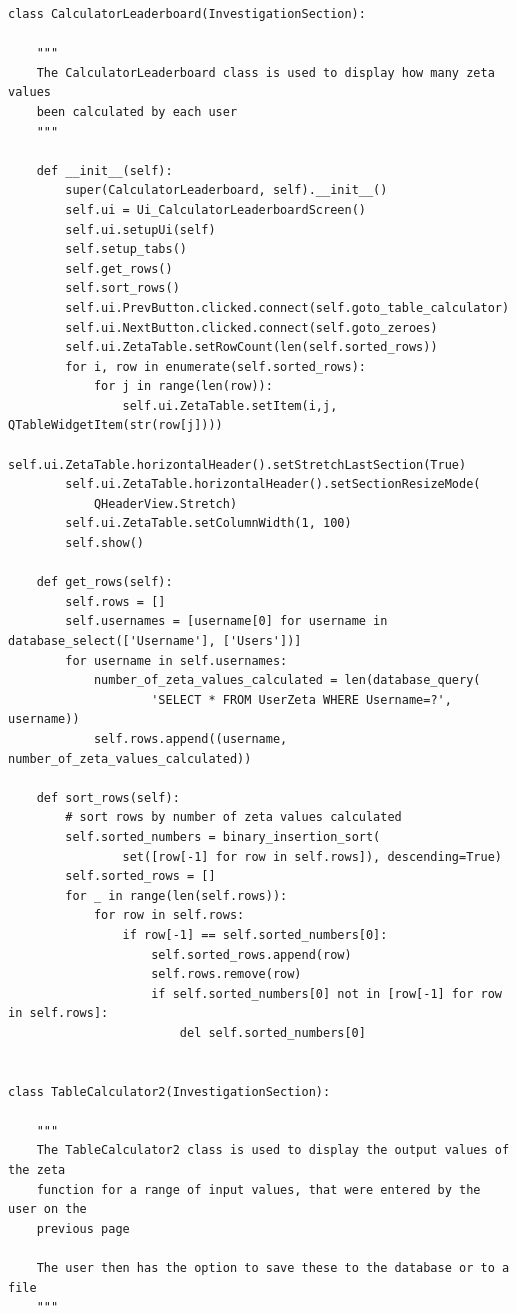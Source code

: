 \documentclass[12pt]{article}
\begin{document}
\begin{lstlisting}
class CalculatorLeaderboard(InvestigationSection):

    """
    The CalculatorLeaderboard class is used to display how many zeta values
    been calculated by each user
    """

    def __init__(self):
        super(CalculatorLeaderboard, self).__init__()
        self.ui = Ui_CalculatorLeaderboardScreen()
        self.ui.setupUi(self)
        self.setup_tabs()
        self.get_rows()
        self.sort_rows()
        self.ui.PrevButton.clicked.connect(self.goto_table_calculator)
        self.ui.NextButton.clicked.connect(self.goto_zeroes)
        self.ui.ZetaTable.setRowCount(len(self.sorted_rows))
        for i, row in enumerate(self.sorted_rows):
            for j in range(len(row)):
                self.ui.ZetaTable.setItem(i,j, QTableWidgetItem(str(row[j])))
        self.ui.ZetaTable.horizontalHeader().setStretchLastSection(True)
        self.ui.ZetaTable.horizontalHeader().setSectionResizeMode(
            QHeaderView.Stretch)
        self.ui.ZetaTable.setColumnWidth(1, 100)
        self.show()

    def get_rows(self):
        self.rows = []
        self.usernames = [username[0] for username in database_select(['Username'], ['Users'])]
        for username in self.usernames:
            number_of_zeta_values_calculated = len(database_query(
                    'SELECT * FROM UserZeta WHERE Username=?', username))
            self.rows.append((username, number_of_zeta_values_calculated))

    def sort_rows(self):
        # sort rows by number of zeta values calculated
        self.sorted_numbers = binary_insertion_sort(
                set([row[-1] for row in self.rows]), descending=True)
        self.sorted_rows = []
        for _ in range(len(self.rows)):
            for row in self.rows:
                if row[-1] == self.sorted_numbers[0]:
                    self.sorted_rows.append(row)
                    self.rows.remove(row)
                    if self.sorted_numbers[0] not in [row[-1] for row in self.rows]:
                        del self.sorted_numbers[0]


class TableCalculator2(InvestigationSection):

    """
    The TableCalculator2 class is used to display the output values of the zeta
    function for a range of input values, that were entered by the user on the
    previous page

    The user then has the option to save these to the database or to a file
    """


\end{lstlisting}
\end{document}
